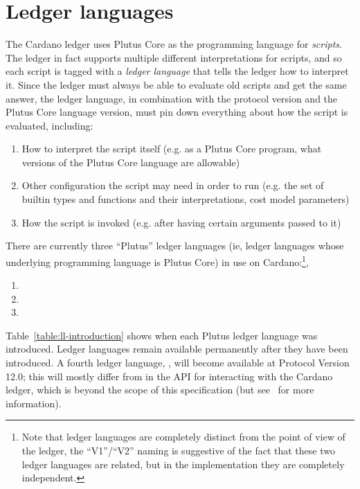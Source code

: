 \section{Ledger languages}

The Cardano ledger uses Plutus Core as the programming language for
\emph{scripts}.  The ledger in fact supports multiple different interpretations
for scripts, and so each script is tagged with a \emph{ledger language} that
tells the ledger how to interpret it.  Since the ledger must always be able to
evaluate old scripts and get the same answer, the ledger language, in
combination with the protocol version and the Plutus Core language version, must
pin down everything about how the script is evaluated, including:

\begin{enumerate}
  \item How to interpret the script itself (e.g. as a Plutus Core program, what
    versions of the Plutus Core language are allowable)
  \item Other configuration the script may need in order to run (e.g. the set of
    builtin types and functions and their interpretations, cost model
    parameters)
  \item How the script is invoked (e.g. after having certain arguments passed to
    it)
\end{enumerate}

There are currently three ``Plutus'' ledger languages (ie, ledger languages
whose underlying programming language is Plutus Core) in use on
Cardano:\footnote{ Note that ledger languages are completely distinct from the
point of view of the ledger, the ``V1''/``V2'' naming is suggestive of the fact
that these two ledger languages are related, but in the implementation they are
completely independent.  },
\begin{enumerate}
  \item {}
  \item {}
  \item {}
\end{enumerate}

\noindent Table~\ref{table:ll-introduction} shows when each Plutus ledger
language was introduced.  Ledger languages remain available permanently after
they have been introduced.  A fourth ledger language, , will become
available at Protocol Version 12.0; this will mostly differ from 
in the API for interacting with the Cardano ledger, which is beyond the scope of
this specification (but see~\cite{plinth-userguide:contexts} for more information).


